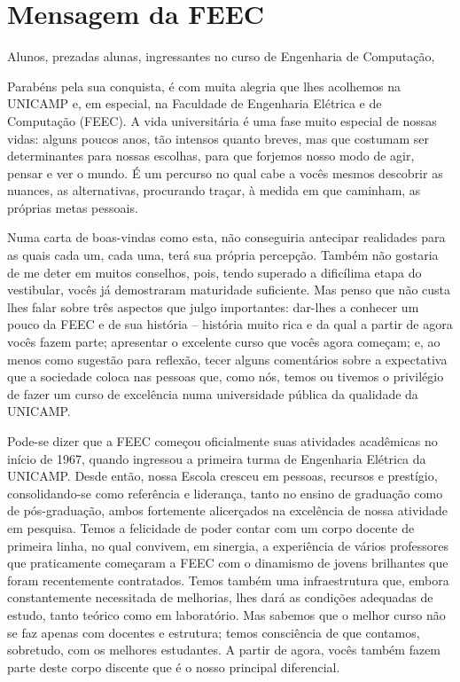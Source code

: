 \section{Mensagem da FEEC}
Alunos, prezadas alunas, ingressantes no curso de Engenharia de Computação,

Parabéns pela sua conquista, é com muita alegria que lhes acolhemos na UNICAMP
e, em especial, na Faculdade de Engenharia Elétrica e de Computação (FEEC). A
vida universitária é uma fase muito especial de nossas vidas: alguns poucos
anos, tão intensos quanto breves, mas que costumam ser determinantes para nossas
escolhas, para que forjemos nosso modo de agir, pensar e ver o mundo. É um
percurso no qual cabe a vocês mesmos descobrir as nuances, as alternativas,
procurando traçar, à medida em que caminham, as próprias metas pessoais.

Numa carta de boas-vindas como esta, não conseguiria antecipar realidades para
as quais cada um, cada uma, terá sua própria percepção. Também não gostaria de
me deter em muitos conselhos, pois, tendo superado a dificílima etapa do
vestibular, vocês já demostraram maturidade suficiente. Mas penso que não custa
lhes falar sobre três aspectos que julgo importantes: dar-lhes a conhecer um
pouco da FEEC e de sua história – história muito rica e da qual a partir de
agora vocês fazem parte; apresentar o excelente curso que vocês agora começam;
e, ao menos como sugestão para reflexão, tecer alguns comentários sobre a
expectativa que a sociedade coloca nas pessoas que, como nós, temos ou tivemos o
privilégio de fazer um curso de excelência numa universidade pública da
qualidade da UNICAMP.

Pode-se dizer que a FEEC começou oficialmente suas atividades acadêmicas no
início de 1967, quando ingressou a primeira turma de Engenharia Elétrica da
UNICAMP. Desde então, nossa Escola cresceu em pessoas, recursos e prestígio,
consolidando-se como referência e liderança, tanto no ensino de graduação como
de pós-graduação, ambos fortemente alicerçados na excelência de nossa atividade
em pesquisa. Temos a felicidade de poder contar com um corpo docente de primeira
linha, no qual convivem, em sinergia, a experiência de vários professores que
praticamente começaram a FEEC com o dinamismo de jovens brilhantes que foram
recentemente contratados. Temos também uma infraestrutura que, embora
constantemente necessitada de melhorias, lhes dará as condições adequadas de
estudo, tanto teórico como em laboratório. Mas sabemos que o melhor curso não se
faz apenas com docentes e estrutura; temos consciência de que contamos,
sobretudo, com os melhores estudantes. A partir de agora, vocês também fazem
parte deste corpo discente que é o nosso principal diferencial.

